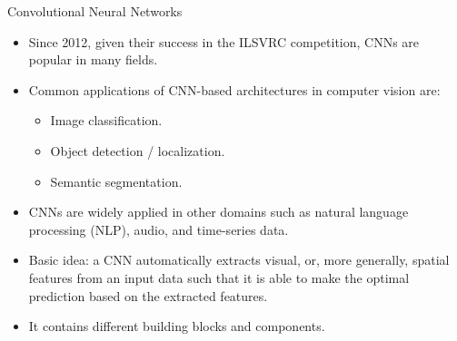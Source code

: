 \begin{vbframe}{Convolutional Neural Networks}
\begin{itemize}
    \item Since 2012, given their success in the ILSVRC competition, CNNs are popular in many fields.
    \item Common applications of CNN-based architectures in computer vision are:
    \begin{itemize}
      \item Image classification.
      \item Object detection / localization.
      \item Semantic segmentation.
    \end{itemize}
    \item CNNs are widely applied in other domains such as natural language processing (NLP), audio, and time-series data.
\item Basic idea: a CNN automatically extracts visual, or, more generally, spatial features from an input data such that it is able to make the optimal prediction based on the extracted features.
\item It contains different building blocks and components. 
\end{itemize}
\end{vbframe}


